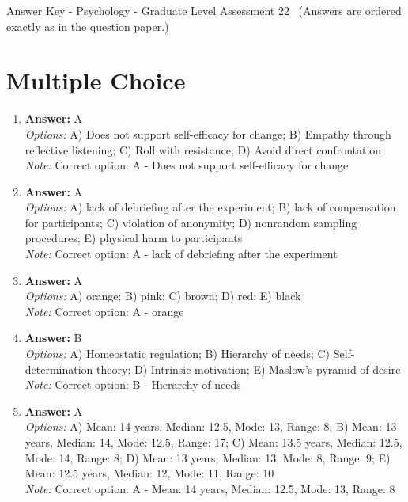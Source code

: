 \documentclass[12pt]{article}
\begin{document}
\begin{center}
Answer Key - Psychology - Graduate Level Assessment 22 \
\small (Answers are ordered exactly as in the question paper.)
\end{center}

\section*{Multiple Choice}
\begin{enumerate}[label=\arabic*.]
\item \textbf{Answer:} A
\\ \textit{Options:} A) Does not support self-efficacy for change; B) Empathy through reflective listening; C) Roll with resistance; D) Avoid direct confrontation
\\ \textit{Note:} Correct option: A - Does not support self-efficacy for change
\item \textbf{Answer:} A
\\ \textit{Options:} A) lack of debriefing after the experiment; B) lack of compensation for participants; C) violation of anonymity; D) nonrandom sampling procedures; E) physical harm to participants
\\ \textit{Note:} Correct option: A - lack of debriefing after the experiment
\item \textbf{Answer:} A
\\ \textit{Options:} A) orange; B) pink; C) brown; D) red; E) black
\\ \textit{Note:} Correct option: A - orange
\item \textbf{Answer:} B
\\ \textit{Options:} A) Homeostatic regulation; B) Hierarchy of needs; C) Self-determination theory; D) Intrinsic motivation; E) Maslow's pyramid of desire
\\ \textit{Note:} Correct option: B - Hierarchy of needs
\item \textbf{Answer:} A
\\ \textit{Options:} A) Mean: 14 years, Median: 12.5, Mode: 13, Range: 8; B) Mean: 13 years, Median: 14, Mode: 12.5, Range: 17; C) Mean: 13.5 years, Median: 12.5, Mode: 14, Range: 8; D) Mean: 13 years, Median: 13, Mode: 8, Range: 9; E) Mean: 12.5 years, Median: 12, Mode: 11, Range: 10
\\ \textit{Note:} Correct option: A - Mean: 14 years, Median: 12.5, Mode: 13, Range: 8
\end{enumerate}
\end{document}
